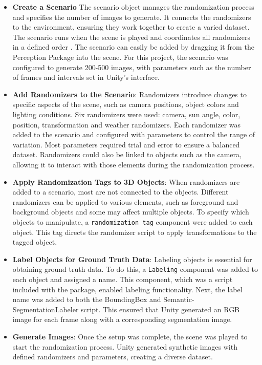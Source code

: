 \begin{itemize} \item \textbf{Create a Scenario}
The scenario object manages the randomization process and specifies the number of images to generate. It connects the randomizers to the environment, ensuring they work together to create a varied dataset. The scenario runs when the scene is played and coordinates all randomizers in a defined order \cite{borkman2021unityperceptiongeneratesynthetic}. The scenario can easily be added by dragging it from the Perception Package into the scene. For this project, the scenario was configured to generate 200-500 images, with parameters such as the number of frames and intervals set in Unity’s interface.

\item \textbf{Add Randomizers to the Scenario}: Randomizers introduce changes to specific aspects of the scene, such as camera positions, object colors and lighting conditions. Six randomizers were used: camera, sun angle, color, position, transformation and weather randomizers. Each randomizer was added to the scenario and configured with parameters to control the range of variation. Most parameters required trial and error to ensure a balanced dataset. Randomizers could also be linked to objects such as the camera, allowing it to interact with those elements during the randomization process.

\item \textbf{Apply Randomization Tags to 3D Objects}: When randomizers are added to a scenario, most are not connected to the objects. Different randomizers can be applied to various elements, such as foreground and background objects and some may affect multiple objects. To specify which objects to manipulate, a \texttt{randomization tag} component were added to each object. This tag directs the randomizer script to apply transformations to the tagged object.

\item \textbf{Label Objects for Ground Truth Data}: Labeling objects is essential for obtaining ground truth data. To do this, a \texttt{Labeling} component was added to each object and assigned a name. This component, which was a script included with the package, enabled labeling functionality. Next, the label name was added to both the BoundingBox and Semantic-SegmentationLabeler script. This ensured that Unity generated an RGB image for each frame along with a corresponding segmentation image.

\item \textbf{Generate Images}: Once the setup was complete, the scene was played to start the randomization process. Unity generated synthetic images with defined randomizers and parameters, creating a diverse dataset.
\end{itemize}


